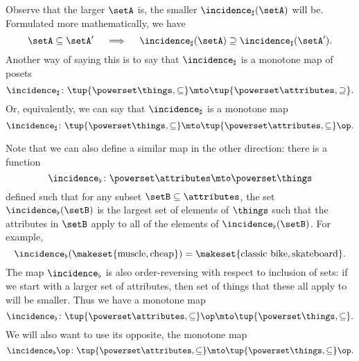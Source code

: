 Observe that the larger $\setA$ is, the smaller $\incidence_\sharp(\setA)$ will be. Formulated more mathematically, we have
\begin{equation}\label{eq:fca-example-pushforward-7}
\setA \subseteq \setA' \quad \implies \quad \incidence_\sharp(\setA) \supseteq \incidence_\sharp(\setA').
\end{equation}
Another way of saying this is to say that $\incidence_\sharp$ is a monotone map of posets 
\begin{equation}\label{eq:fca-example-pushforward-8}
\incidence_\sharp \colon \tup{\powerset \things, \subseteq} \mto \tup{\powerset \attributes, \supseteq}. 
\end{equation}
Or, equivalently, we can say that $\incidence_\sharp$ is a monotone map
\begin{equation}\label{eq:fca-example-pushforward-9}
\incidence_\sharp \colon \tup{\powerset \things, \subseteq} \mto \tup{\powerset \attributes, \subseteq}\op. 
\end{equation}

Note that we can also define a similar map in the other direction: there is a function
\begin{equation}\label{eq:fca-example-pullback-1}
\incidence_\flat \colon \powerset \attributes \mto \powerset \things
\end{equation}
defined such that for any subset $\setB \subseteq \attributes$, the set $\incidence_\flat(\setB)$ is the largest set of elements of $\things$ such that the attributes in $\setB$ apply to all of the elements of $\incidence_\flat(\setB)$. 
For example, 
\begin{equation}
\incidence_\flat(\makeset{\text{muscle}, \text{cheap}}) = \makeset{\text{classic bike}, \text{skateboard}}.
\end{equation}
The map $\incidence_\flat$  is also order-reversing with respect to inclusion of sets: if we start with a larger set of attributes, then set of things that these all apply to will be smaller. Thus we have a monotone map 
\begin{equation}\label{eq:fca-example-pullback-2}
\incidence_\flat \colon \tup{\powerset \attributes, \subseteq}\op \mto \tup{\powerset \things, \subseteq}.
\end{equation}
We will also want to use its opposite, the monotone map
\begin{equation}\label{eq:fca-example-pullback-3}
\incidence_\flat\op \colon \tup{\powerset \attributes, \subseteq} \mto \tup{\powerset \things, \subseteq}\op.
\end{equation}

